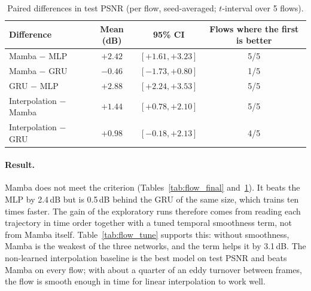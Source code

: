 \begin{table}[htbp]
  \centering
  \caption{Controlled comparison, 10\% observed, 5 flows $\times$ 3 seeds (interpolation: 5 flows). PSNR (dB) on the
  5 unseen frames; observed/unobserved pixels refer to training frames; spectrum error is the mean
  $|\log_{10}(E_{\mathrm{rec}}/E_{\mathrm{true}})|$ for $k\le32$.}
  \label{tab:flow_final}
\end{table}

\begin{table}[htbp]
  \centering
  \caption{Paired differences in test PSNR (per flow, seed-averaged; $t$-interval over 5 flows).}
  \label{tab:flow_paired}
  \begin{tabular}{lccc}
    \toprule
    Difference & Mean (dB) & 95\% CI & Flows where the first is better \\
    \midrule
    Mamba $-$ MLP & $+2.42$ & $[+1.61, +3.23]$ & 5/5 \\
    Mamba $-$ GRU & $-0.46$ & $[-1.73, +0.80]$ & 1/5 \\
    GRU $-$ MLP & $+2.88$ & $[+2.24, +3.53]$ & 5/5 \\
    Interpolation $-$ Mamba & $+1.44$ & $[+0.78, +2.10]$ & 5/5 \\
    Interpolation $-$ GRU & $+0.98$ & $[-0.18, +2.13]$ & 4/5 \\
    \bottomrule
  \end{tabular}
\end{table}

\paragraph{Result.} Mamba does not meet the criterion (Tables~\ref{tab:flow_final} and~\ref{tab:flow_paired}). It
beats the MLP by 2.4\,dB but is 0.5\,dB behind the GRU of the same size, which trains ten times faster. The gain of
the exploratory runs therefore comes from reading each trajectory in time order together with a tuned temporal
smoothness term, not from Mamba itself. Table~\ref{tab:flow_tune} supports this: without smoothness, Mamba is the
weakest of the three networks, and the term helps it by 3.1\,dB. The non-learned interpolation baseline is the best
model on test PSNR and beats Mamba on every flow; with about a quarter of an eddy turnover between frames, the flow is
smooth enough in time for linear interpolation to work well.

